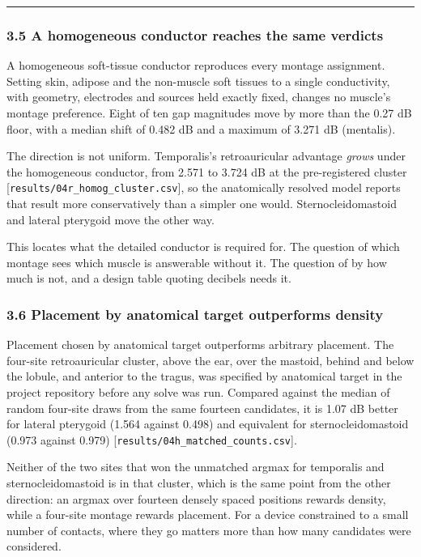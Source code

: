 \documentclass[
  11pt,
  a4paper,
]{article}
\begin{document}
\begin{center}\rule{0.5\linewidth}{0.5pt}\end{center}

\subsubsection{3.5 A homogeneous conductor reaches the same verdicts}\label{a-homogeneous-conductor-reaches-the-same-verdicts}

A homogeneous soft-tissue conductor reproduces every montage assignment.
Setting skin, adipose and the non-muscle soft tissues to a single conductivity,
with geometry, electrodes and sources held exactly fixed, changes no muscle's
montage preference. Eight of ten gap magnitudes move by more than the 0.27 dB
floor, with a median shift of 0.482 dB and a maximum of 3.271 dB (mentalis).

The direction is not uniform. Temporalis's retroauricular advantage \emph{grows}
under the homogeneous conductor, from \textminus{}2.571 to \textminus{}3.724 dB at the pre-registered
cluster {[}\texttt{results/04r\_homog\_cluster.csv}{]}, so the anatomically resolved model
reports that result more conservatively than a simpler one would.
Sternocleidomastoid and lateral pterygoid move the other way.

This locates what the detailed conductor is required for. The question of
which montage sees which muscle is answerable without it. The question of by
how much is not, and a design table quoting decibels needs it.

\subsubsection{3.6 Placement by anatomical target outperforms density}\label{placement-by-anatomical-target-outperforms-density}

Placement chosen by anatomical target outperforms arbitrary placement. The
four-site retroauricular cluster, above the ear, over the mastoid, behind and
below the lobule, and anterior to the tragus, was specified by anatomical
target in the project repository before any solve was run. Compared against
the median of random four-site draws from the same fourteen candidates, it is
1.07 dB better for lateral pterygoid (\textminus{}1.564 against \textminus{}0.498) and equivalent
for sternocleidomastoid (\textminus{}0.973 against \textminus{}0.979)
{[}\texttt{results/04h\_matched\_counts.csv}{]}.

Neither of the two sites that won the unmatched argmax for temporalis and
sternocleidomastoid is in that cluster, which is the same point from the other
direction: an argmax over fourteen densely spaced positions rewards density,
while a four-site montage rewards placement. For a device constrained to a
small number of contacts, where they go matters more than how many candidates
were considered.
\end{document}
